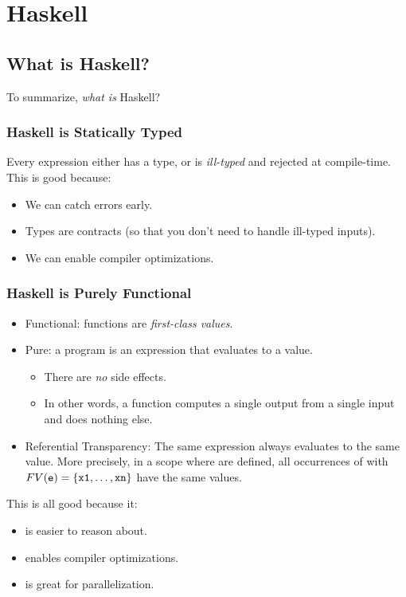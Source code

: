 \documentclass[letterpaper]{article}
\begin{document}
\section{Haskell}

\subsection{What is Haskell?}
To summarize, \emph{what is} Haskell?

\subsubsection{Haskell is Statically Typed}
Every expression either has a type, or is \emph{ill-typed} and rejected at compile-time. This is good because: 
\begin{itemize}
    \item We can catch errors early. 
    \item Types are contracts (so that you don't need to handle ill-typed inputs).
    \item We can enable compiler optimizations. 
\end{itemize}

\subsubsection{Haskell is Purely Functional}
\begin{itemize}
    \item Functional: functions are \emph{first-class values}.
    \item Pure: a program is an expression that evaluates to a value. 
    \begin{itemize}
        \item There are \emph{no} side effects. 
        \item In other words, a function  computes a single  output from a single  input and does nothing else. 
    \end{itemize}
    \item Referential Transparency: The same expression always evaluates to the same value. More precisely, in a scope where  are defined, all occurrences of  with $FV(\texttt{e}) = \{\texttt{x1}, \dots, \texttt{xn}\}$ have the same values. 
\end{itemize}
This is all good because it:
\begin{itemize}
    \item is easier to reason about. 
    \item enables compiler optimizations. 
    \item is great for parallelization. 
\end{itemize}
\end{document}
